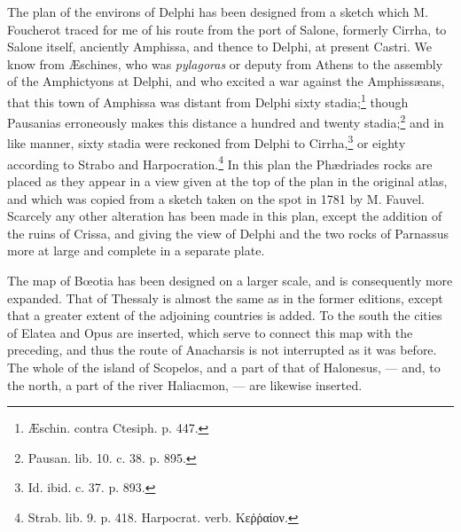 \documentclass[a4paper, 11pt, oneside, polutonikogreek, english]{article}
\begin{document}
The plan of the environs of Delphi has been designed from a sketch which M. Foucherot traced for me of his route from the port of Salone, formerly Cirrha, to Salone itself, anciently Amphissa, and thence to Delphi, at present Castri. We know from Æschines, who was \emph{pylagoras} or deputy from Athens to the assembly of the Amphictyons at Delphi, and who excited a war against the Amphissæans, that this town of Amphissa was distant from Delphi sixty stadia;\footnote{Æschin. contra Ctesiph. p. 447.} though Pausanias erroneously makes this distance a hundred and twenty stadia;\footnote{Pausan. lib. 10. c. 38. p. 895.} and in like manner, sixty stadia were reckoned from Delphi to Cirrha,\footnote{Id. ibid. c. 37. p. 893.} or eighty according to Strabo and Harpocration.\footnote{Strab. lib. 9. p. 418. Harpocrat. verb. Κεῤῥαίον.} In this plan the Phædriades rocks are placed as they appear in a view given at the top of the plan in the original atlas, and which was copied from a sketch taken on the spot in 1781 by M. Fauvel. Scarcely any other alteration has been made in this plan, except the addition of the ruins of Crissa, and giving the view of Delphi and the two rocks of Parnassus more at large and complete in a separate plate.

The map of Bœotia has been designed on a larger scale, and is consequently more expanded. That of Thessaly is almost the same as in the former editions, except that a greater extent of the adjoining countries is added. To the south the cities of Elatea and Opus are inserted, which serve to connect this map with the preceding, and thus the route of Anacharsis is not interrupted as it was before. The whole of the island of Scopelos, and a part of that of Halonesus, --- and, to the north, a part of the river Haliacmon, --- are likewise inserted.
\end{document}
